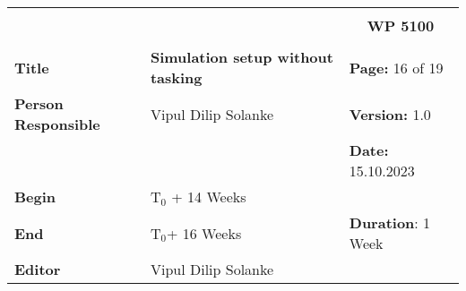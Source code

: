 \begin{table}[!h]
  \begin{center}
    \begin{tabular}{|p{35mm}||p{55mm}|p{50mm}||p{40mm}|}
      \hline
      \multicolumn{3}{|l||}{\textbf{}} & \multicolumn{1}{c|}{}                                                                                                                                                \\
      \multicolumn{3}{|l||}{\textbf{}} & \multicolumn{1}{c|}{\textbf{WP 5100}}                                                                                                                                \\
      \multicolumn{3}{|l||}{\textbf{}} & \multicolumn{1}{c|}{}                                                                                                                                                \\
      \hline\hline
      \textbf{Title}                   & \multicolumn{2}{p{7cm}||}{\textbf{Simulation setup without tasking}}
                                       & \textbf{Page:} 16 of 19                                                                                                                                             \\
      \hline
      \textbf{Person Responsible}        & \multicolumn{2}{l||}{Vipul Dilip Solanke}                                                                                                   & \textbf{Version:} 1.0   \\
      \hline
      \multicolumn{3}{|l||}{}          & \textbf{Date:} 15.10.2023                                                                                                                                          \\
      \hline\hline
      \textbf{Begin}                  & \multicolumn{2}{l||}{T$_0$ + 14 Weeks}                                                                                                                &                         \\
      \hline
      \textbf{End}                    & \multicolumn{2}{l||}{T$_0$+ 16 Weeks}                                                                                                        & \textbf{Duration}: 1 Week \\
      \hline\hline
      \textbf{Editor}              & \multicolumn{3}{l|}{Vipul Dilip Solanke}                                                                                                                              \\

\end{tabular}
\end{center}
\end{table}
